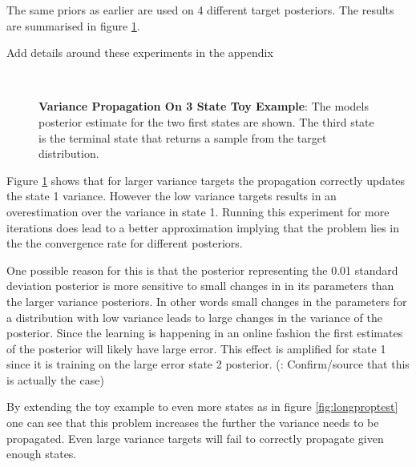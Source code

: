 The same priors as earlier are used on 4 different target posteriors. The results are summarised in figure \ref{fig:3stateproptest}.

\todo Add details around these experiments in the appendix

\begin{figure}[H]
    \centering

    \\
    \caption{\textbf{Variance Propagation On 3 State Toy Example}: The models posterior estimate for the two first states are shown. The third state is the terminal state that returns a sample from the target distribution.}
    \label{fig:3stateproptest}
\end{figure}

Figure \ref{fig:3stateproptest} shows that for larger variance targets the propagation correctly updates the state 1 variance. However the low variance targets results in an overestimation over the variance in state 1. Running this experiment for more iterations does lead to a better approximation implying that the problem lies in the the convergence rate for different posteriors. 

One possible reason for this is that the posterior representing the 0.01 standard deviation posterior is more sensitive to small changes in in its parameters than the larger variance posteriors. In other words small changes in the parameters for a distribution with low variance leads to large changes in the variance of the posterior. Since the learning is happening in an online fashion the first estimates of the posterior will likely have large error. This effect is amplified for state 1 since it is training on the large error state 2 posterior. (\todo: Confirm/source that this is actually the case)

By extending the toy example to even more states as in figure \ref{fig:longproptest} one can see that this problem increases the further the variance needs to be propagated. Even large variance targets will fail to correctly propagate given enough states.

